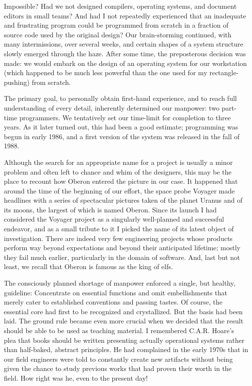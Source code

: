 Impossible? Had we not designed compilers, operating systems, and
document editors in small teams? And had I not repeatedly experienced
that an inadequate and frustrating program could be programmed from
scratch in a fraction of source code used by the original design? Our
brain-storming continued, with many intermissions, over several
weeks, and certain shapes of a system structure slowly emerged through
the haze. After some time, the preposterous decision was made: we
would embark on the design of an operating system for our workstation
(which happened to be much less powerful than the one used for my
rectangle-pushing) from scratch.

The primary goal, to personally obtain first-hand experience, and to
reach full understanding of every detail, inherently determined our
manpower: two part-time programmers. We tentatively set our time-limit
for completion to three years. As it later turned out, this had been a
good estimate; programming was begun in early 1986, and a first
version of the system was released in the fall of 1988.

Although the search for an appropriate name for a project is usually a
minor problem and often left to chance and whim of the designers, this
may be the place to recount how Oberon entered the picture in our
case. It happened that around the time of the beginning of our effort,
the space probe Voyager made headlines with a series of spectacular
pictures taken of the planet Uranus and of its moons, the largest of
which is named Oberon. Since its launch I had considered the Voyager
project as a singularly well-planned and successful endeavor, and as a
small tribute to it I picked the name of its latest object of
investigation. There are indeed very few engineering projects whose
products perform way beyond expectations and beyond their anticipated
lifetime; mostly they fail much earlier, particularly in the domain of
software. And, last but not least, we recall that Oberon is famous as
the king of elfs.

The consciously planned shortage of manpower enforced a single, but
healthy, guideline: Concentrate on essential functions and omit
embellishments that merely cater to established conventions and
passing tastes. Of course, the essential core had first to be
recognized and crystallized. But the basis had been laid. The ground
rule became even more crucial when we decided that the result should
be able to be used as teaching material. I remembered C.A.R. Hoare's
plea that books should be written presenting actually operational
systems rather than half-baked, abstract principles. He had
complained in the early 1970s that in our field engineers were told to
constantly create new artifacts without being given the chance to
study previous works that had proven their worth in the field. How
right was he, even to the present day!

